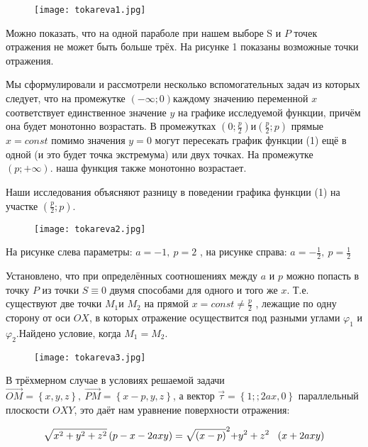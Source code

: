 \begin{figure}[h]
	\centering
	\texttt{[image: tokareva1.jpg]}
\end{figure}

Можно показать, что на одной параболе при нашем выборе S и $P$ точек отражения не может быть больше трёх. На рисунке 1 показаны возможные точки отражения.

Мы сформулировали и рассмотрели несколько вспомогательных задач из которых следует, что на промежутке $\left(-\infty ;0\right)$каждому значению переменной $x$ соответствует единственное значение $y$ на графике исследуемой функции, причём она будет монотонно возрастать. В промежутках $\left(0;\frac{p}{2}\right)и\left(\frac{p}{2};p\right)$ прямые $x=const$ помимо значения $y=0$ могут пересекать график функции (1) ещё в одной (и это будет точка экстремума) или двух точках. На промежутке $\left(p;+\infty \right).$ наша функция также монотонно возрастает.

Наши исследования объясняют разницу в поведении графика функции (1) на участке $\left(\frac{p}{2};p\right)$.

\begin{figure}[h]
	\centering
	\texttt{[image: tokareva2.jpg]}
\end{figure}

На рисунке слева параметры: $a=-1,\ p=2$ , на рисунке справа: $a=-\frac{1}{2},\ p=\frac{1}{2}$

Установлено, что при определённых соотношениях между $a$ и $p$ можно попасть в точку $P$ из точки $S\equiv 0$ двумя способами для одного и того же $x$. Т.е. существуют две точки $M_1 $и $M_2$ на прямой $x=const\ne \frac{p}{2}$ , лежащие по одну сторону от оси $OX$, в которых отражение осуществится под разными углами $\varphi_1$ и $\varphi_2$.Найдено условие, когда $M_1=M_2$.

\begin{figure}[h]
	\centering
	\texttt{[image: tokareva3.jpg]}
\end{figure}

В трёхмерном случае в условиях решаемой задачи $\overrightarrow{OM}=\left\{x,y,z\right\},\ \overrightarrow{PM}=\left\{x-p,y,z\right\}$, а вектор $\overrightarrow{\tau }=\left\{1;;2ax,0\right\}$ параллельный плоскости $OXY$, это даёт нам уравнение поверхности отражения:

\begin{equation} \label{GrindEQ__2_} \sqrt{x^2+y^2+z^2}\left(p-x-2axy\right)=\sqrt{(x-p)}^{{\rm 2}}{\rm +}y^{{\rm 2}}+z^{{\rm 2}}\ \ \left(x+2axy\right) \end{equation}

